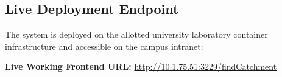 \documentclass[manuscript,screen]{acmart}
\begin{document}
\subsection{Live Deployment Endpoint}
The system is deployed on the allotted university laboratory container infrastructure and accessible on the campus intranet:
\begin{center}
\textbf{Live Working Frontend URL:} \url{http://10.1.75.51:3229/findCatchment}
\end{center}
\end{document}
